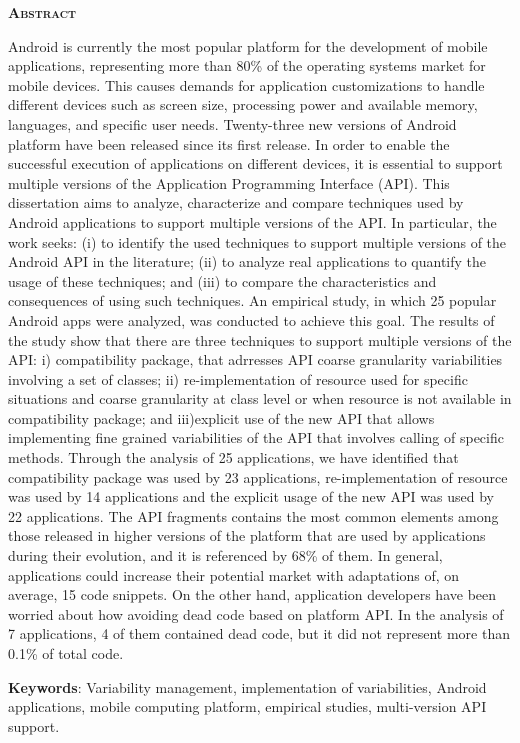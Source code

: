 
\begin{center}
	\Large{\textsc{\textbf{Abstract}}}
\end{center}

\noindent Android is currently the most popular platform for the development
of mobile applications, representing more than 80\% of the operating systems market
for mobile devices. This causes demands for application customizations to handle
different devices such as screen size, processing power and available memory, languages,
​​and specific user needs. Twenty-three new versions of Android platform have been
released since its first release. In order to enable the successful execution of
applications on different devices, it is essential to support multiple versions of
the Application Programming Interface (API). This dissertation aims to analyze,
characterize and compare techniques used by Android applications to support multiple
versions of the API. In particular, the work seeks: (i) to identify the used techniques
to support multiple versions of the Android API in the literature; (ii) to analyze real
applications to quantify the usage of these techniques; and (iii) to compare the
characteristics and consequences of using such techniques. An empirical study, in which
25 popular Android apps were analyzed, was conducted to achieve this goal. The results
of the study show that there are three techniques to support multiple versions of the
API:
i) compatibility package, that adrresses API coarse granularity variabilities involving
a set of classes; 
ii) re-implementation of resource used for specific situations and coarse granularity
at class level or when resource is not available in compatibility package; and
iii)explicit use of the new API that allows implementing fine grained variabilities of the
API that involves
calling of specific methods. Through the analysis of 25 applications, we have identified
that compatibility package was used by 23 applications, re-implementation of resource was
used by 14 applications and the explicit usage of the new API was used by 22 applications.
The API fragments contains the most common elements among those released in higher versions
of the platform that are used by applications during their evolution, and it is referenced
by 68\% of them. In general, applications could increase their potential market with adaptations
of, on average, 15 code snippets. On the other hand, application developers have been worried
about how avoiding dead code based on platform API. In the analysis of 7 applications, 4 of
them contained dead code, but it did not represent more than 0.1\% of total code.

\noindent\textbf{Keywords}:  Variability management, implementation of variabilities,
Android applications, mobile computing platform, empirical studies, multi-version API support.

